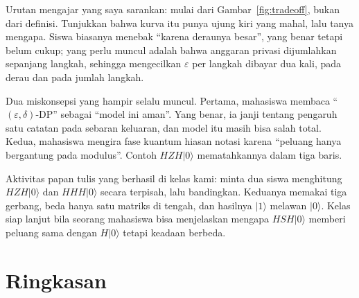 \begin{untukdosen}
Urutan mengajar yang saya sarankan: mulai dari Gambar~\ref{fig:tradeoff}, bukan dari
definisi. Tunjukkan bahwa kurva itu punya ujung kiri yang mahal, lalu tanya mengapa.
Siswa biasanya menebak ``karena deraunya besar'', yang benar tetapi belum cukup; yang
perlu muncul adalah bahwa anggaran privasi dijumlahkan sepanjang langkah, sehingga
mengecilkan $\varepsilon$ per langkah dibayar dua kali, pada derau dan pada jumlah
langkah.

Dua miskonsepsi yang hampir selalu muncul. Pertama, mahasiswa membaca
``$(\varepsilon,\delta)$-DP'' sebagai ``model ini aman''. Yang benar, ia janji tentang
pengaruh satu catatan pada sebaran keluaran, dan model itu masih bisa salah total. Kedua,
mahasiswa mengira fase kuantum hiasan notasi karena ``peluang hanya bergantung pada
modulus''. Contoh $HZH|0\rangle$ mematahkannya dalam tiga baris.

Aktivitas papan tulis yang berhasil di kelas kami: minta dua siswa menghitung
$HZH|0\rangle$ dan $HHH|0\rangle$ secara terpisah, lalu bandingkan. Keduanya memakai
tiga gerbang, beda hanya satu matriks di tengah, dan hasilnya $|1\rangle$ melawan
$|0\rangle$. Kelas siap lanjut bila seorang mahasiswa bisa menjelaskan mengapa
$HSH|0\rangle$ memberi peluang sama dengan $H|0\rangle$ tetapi keadaan berbeda.
\end{untukdosen}

\section{Ringkasan}

